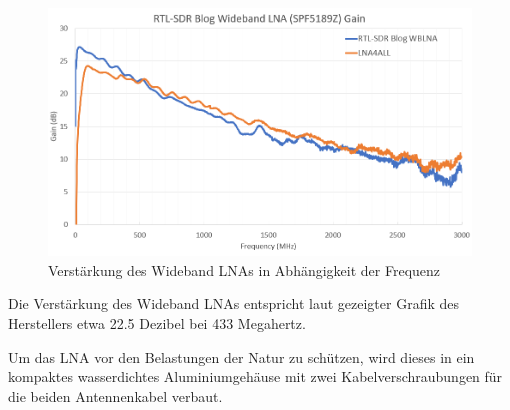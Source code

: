 \begin{figure}[H]
	\centering
	\includegraphics[width=.75\linewidth]{../ref/wideband_lna_gain.png}
	\caption{Verstärkung des Wideband LNAs in Abhängigkeit der Frequenz \cite{noauthor_new_nodate}}
	\label{fig:wideband_lna_gain}
\end{figure}

Die Verstärkung des Wideband LNAs entspricht laut gezeigter Grafik des Herstellers etwa 22.5 Dezibel bei 433 Megahertz.

Um das LNA vor den Belastungen der Natur zu schützen, wird dieses in ein kompaktes wasserdichtes Aluminiumgehäuse mit zwei Kabelverschraubungen für die beiden Antennenkabel verbaut. 


